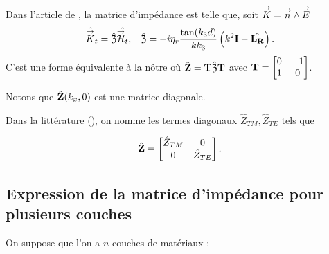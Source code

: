         Dans l'article de \cite{marceaux_high-order_2000}, la matrice d'impédance est telle que, soit \(\vK = \vn \pvect \vE\)
        \begin{align*}
             \hat{\vK}_t = \hat{\mathfrak{Z}} \hat{\vH_t}, && \hat{\mathfrak{Z}} = -i\eta_r\frac{\tan(k_3d)}{kk_3}\left(k^2\mI - \hat{\mLR}\right).
        \end{align*}
        C'est une forme équivalente à la nôtre où \(\hat{\mZ} = \mT\hat{\mathfrak{Z}}\mT\) avec \(\mT = \begin{bmatrix}0&-1\\1&0\end{bmatrix}\).

        Notons que \(\hat\mZ(k_x,0)\) est une matrice diagonale.
        
        Dans la littérature (\cite{stupfel_implementation_2015,aubakirov_electromagnetic_2014,hoppe_impedance_1995}), on nomme les termes diagonaux \(\hat Z_{TM}, \hat Z_{TE}\) tels que
        
        \begin{equation*}
            \hat \mZ =
            \begin{bmatrix}
                \hat Z_{TM} & 0
                \\
                0 & \hat Z_{TE}
            \end{bmatrix}.
        \end{equation*}

  \subsection{Expression de la matrice d'impédance pour plusieurs couches}
    On suppose que l'on a \(n\) couches de matériaux :
    \begin{figure}[h!btp]
        \centering
        \begin{tikzpicture}
            
        \end{tikzpicture}
    \end{figure}

